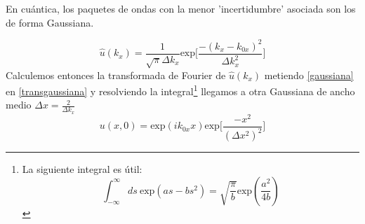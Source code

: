 \begin{marginfigure}
\begin{qbox}{}
En cuántica, los paquetes de ondas con la menor 'incertidumbre' asociada son los de forma Gaussiana.   
\end{qbox}

\end{marginfigure}

\begin{equation}
    \hat{u}(k_x) = \frac{1}{\sqrt{\pi}\Delta k_x} \mathrm{exp}\biggr[\frac{-(k_x-k_{0x})^2}{\Delta k_x^2}\biggr]
    \label{gaussiana}
\end{equation}
Calculemos entonces la transformada de Fourier de $\hat{u}(k_x)$ metiendo \ref{gaussiana} en \ref{transgaussiana} y resolviendo la integral\footnote{La siguiente integral es útil: $$\int_{-\infty}^{\infty} ds~ \mathrm{exp}(as-bs^2) = \sqrt{\frac{\pi}{b}}\mathrm{exp}(\frac{a^2}{4b})$$} llegamos a otra Gaussiana de ancho medio $\Delta x = \frac{2}{\Delta k_x}$
\begin{equation}
    u(x,0) =  \mathrm{exp}(ik_{0x}x) \mathrm{exp}\biggr[\frac{-x^2}{(\Delta x^2)^2}\biggr]
\end{equation}

